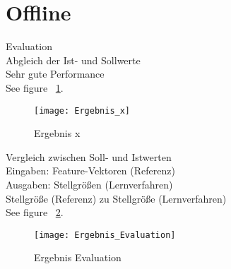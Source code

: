 \section{Offline} %
\label{sec:Offline}
Evaluation\\
Abgleich der Ist- und Sollwerte\\
Sehr gute Performance\\
See figure ~\ref{fig:Ergebnis_x}.\\

\begin{figure}[htbp]
\begin{center}
\texttt{[image: Ergebnis\_x]}
\caption{Ergebnis x}
\label{fig:Ergebnis_x}
\end{center}
\end{figure}

Vergleich zwischen Soll- und Istwerten\\
Eingaben: Feature-Vektoren (Referenz)\\
Ausgaben: Stellgrößen (Lernverfahren)\\
Stellgröße (Referenz) zu Stellgröße (Lernverfahren)\\
See figure ~\ref{fig:Ergebnis_Evaluation}.\\

\begin{figure}[htbp]
\begin{center}
\texttt{[image: Ergebnis\_Evaluation]}
\caption{Ergebnis Evaluation}
\label{fig:Ergebnis_Evaluation}
\end{center}
\end{figure}


